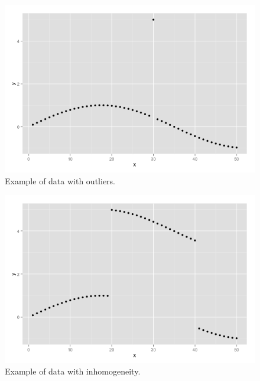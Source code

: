 \documentclass[conference]{IEEEtran}
\begin{document}
\begin{figure}
	\includegraphics[width=\linewidth]{figure1.png}
	\caption{Example of data with outliers.}
	\label{fig:example_outliers}
\end{figure}

\begin{figure}
	\includegraphics[width=\linewidth]{figure2.png}
	\caption{Example of data with inhomogeneity.}
	\label{fig:example_inhomogeneity}
\end{figure}
\end{document}
